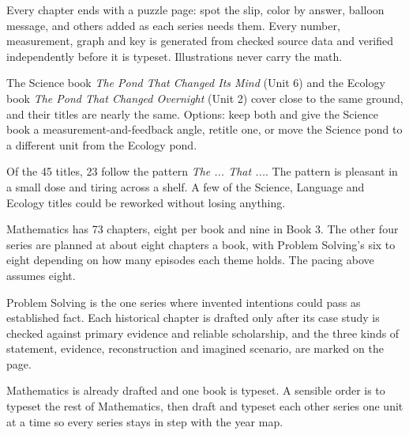 \documentclass[10.5pt]{article}
\begin{document}
Every chapter ends with a puzzle page: spot the slip, color by answer, balloon message, and others added as each series needs them. Every number, measurement, graph and key is generated from checked source data and verified independently before it is typeset. Illustrations never carry the math.

\newpage
{}

The Science book \textit{The Pond That Changed Its Mind} (Unit 6) and the Ecology book \textit{The Pond That Changed Overnight} (Unit 2) cover close to the same ground, and their titles are nearly the same. Options: keep both and give the Science book a measurement-and-feedback angle, retitle one, or move the Science pond to a different unit from the Ecology pond.

Of the 45 titles, 23 follow the pattern \textit{The ... That ...}. The pattern is pleasant in a small dose and tiring across a shelf. A few of the Science, Language and Ecology titles could be reworked without losing anything.

Mathematics has 73 chapters, eight per book and nine in Book 3. The other four series are planned at about eight chapters a book, with Problem Solving's six to eight depending on how many episodes each theme holds. The pacing above assumes eight.

Problem Solving is the one series where invented intentions could pass as established fact. Each historical chapter is drafted only after its case study is checked against primary evidence and reliable scholarship, and the three kinds of statement, evidence, reconstruction and imagined scenario, are marked on the page.

Mathematics is already drafted and one book is typeset. A sensible order is to typeset the rest of Mathematics, then draft and typeset each other series one unit at a time so every series stays in step with the year map.
\end{document}
